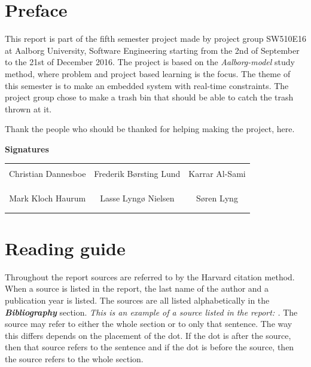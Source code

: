 \chapter*{Preface}
This report is part of the fifth semester project made by project group SW510E16 at Aalborg University, Software Engineering starting from the 2nd of September to the 21st of December 2016. \newline
The project is based on the \textit{Aalborg-model} study method, where problem and project based learning is the focus. The theme of this semester is to make an embedded system with real-time constraints. The project group chose to make a trash bin that should be able to catch the trash thrown at it. \newline

Thank the people who should be thanked for helping making the project, here. 
\newline
\newline
\newline
\newline

{\Huge\textbf{Signatures}}
\newline
\newline

\begin{table}[H]
	\centering
		\begin{tabular}{c c c}
			\underline{\phantom{mmmmmmmmmmmmmm}} & \underline{\phantom{mmmmmmmmmmmmmm}} & \underline{\phantom{mmmmmmmmmmmmmm}} \\
			Christian Dannesboe			& Frederik Børsting Lund 		& Karrar Al-Sami 			\\
			&&\\
			&&\\
			\underline{\phantom{mmmmmmmmmmmmmm}} & \underline{\phantom{mmmmmmmmmmmmmm}} & \underline{\phantom{mmmmmmmmmmmmmm}} \\
			Mark Kloch Haurum			& Lasse Lyngø Nielsen 		& Søren Lyng 				\\
			&&\\
			&&\\
		 																		
		\end{tabular}
\end{table}

\chapter*{Reading guide}
Throughout the report sources are referred to by the Harvard citation method. When a source is listed in the report, the last name of the author and a publication year is listed. The sources are all listed alphabetically in  the \textit{\textbf{Bibliography}} section. \newline
\textit{This is an example of a source listed in the report: \textbf{\citep{kw}}.} \newline
The source may refer to either the whole section or to only that sentence. The way this differs depends on the placement of the dot. If the dot is after the source, then that source refers to the sentence and if the dot is before the source, then the source refers to the whole section. 


